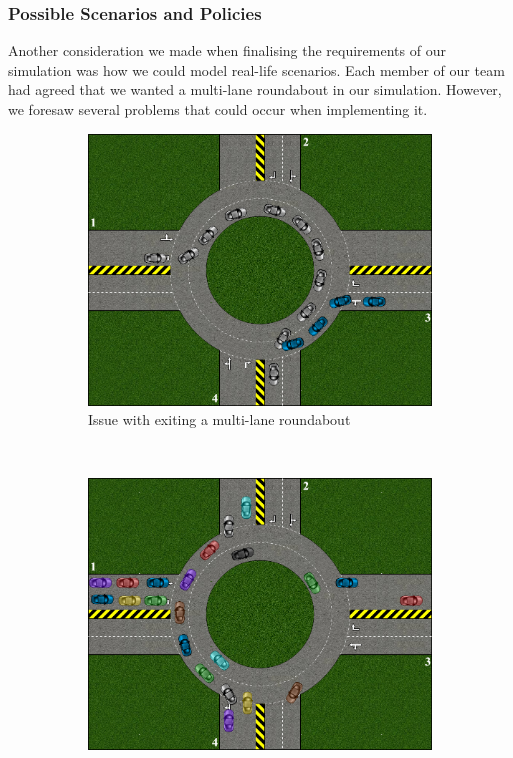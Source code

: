 \documentclass{article}
\begin{document}
	\subsubsection{Possible Scenarios and Policies}
	
	Another consideration we made when finalising the requirements of our simulation was how we could model real-life scenarios. Each member of our team had agreed that we wanted a multi-lane roundabout in our simulation. However, we foresaw several problems that could occur when implementing it. 
	
    
\begin{figure}
    \centering
    \begin{subfigure}[h]{0.5\textwidth}
        \includegraphics[width=\textwidth]{CarCrash3}
        \caption{Issue with exiting a multi-lane roundabout}
        \label{CarCrash3}
    \end{subfigure}%
    ~ %
    \begin{subfigure}[h ]{0.5\textwidth}
        \includegraphics[width=\textwidth]{SteadyFlow}

\end{subfigure}
\end{figure}
\end{document}

